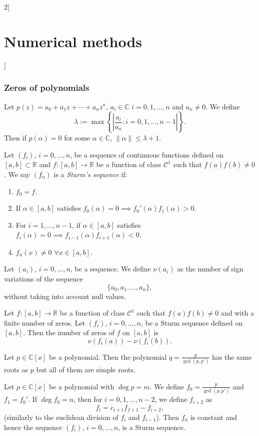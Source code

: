 \documentclass[class=article,10pt,crop=false]{standalone}
\begin{document}
\begin{multicols}{2}[\section{Numerical methods}]
\subsubsection*{Zeros of polynomials}
\begin{lemma}
Let $p(z)=a_0+a_1z+\cdots+a_nz^n$, $a_i\in\mathbb{C}$ $i=0,1,\ldots,n$ and $a_n\ne 0$. We define $$\lambda:=\max\left\{\left|\frac{a_i}{a_n}:i=0,1,\ldots,n-1\right|\right\}.$$ Then if $p(\alpha)=0$ for some $\alpha\in\mathbb{C}$, $\|\alpha\|\leq\lambda+1$.
\end{lemma}
\begin{definition}
Let $(f_i)$, $i=0,\ldots,n$, be a sequence of continuous functions defined on $[a,b]\subset\mathbb{R}$ and $f:[a,b]\rightarrow\mathbb{R}$ be a function of class $\mathcal{C}^1$ such that $f(a)f(b)\ne 0$. We say $(f_n)$ is a \textit{Sturm's sequence} if:
\begin{enumerate}
    \item $f_0=f$.
    \item If $\alpha\in[a,b]$ satisfies $f_0(\alpha)=0\implies f_0'(\alpha)f_1(\alpha)>0$.
    \item For $i=1,\ldots,n-1$, if $\alpha\in[a,b]$ satisfies $f_i(\alpha)=0\implies f_{i-1}(\alpha)f_{i+1}(\alpha)<0$.
    \item $f_n(x)\ne0$ $\forall x\in[a,b]$.
\end{enumerate}
\end{definition}
\begin{definition}
Let $(a_i)$, $i=0,\ldots,n$, be a sequence. We define $\nu(a_i)$ as the number of sign variations of the sequence $$\{a_0,a_1,\ldots,a_n\},$$ without taking into account null values. 
\end{definition}
\begin{theorem}
Let $f:[a,b]\rightarrow\mathbb{R}$ be a function of class $\mathcal{C}^1$ such that $f(a)f(b)\ne 0$ and with a finite number of zeros. Let $(f_i)$, $i=0,\ldots,n$, be a Sturm sequence defined on $[a,b]$. Then the number of zeros of $f$ on $[a,b]$ is $$\nu\left(f_i(a)\right)-\nu\left(f_i(b)\right).$$
\end{theorem}
\begin{lemma}
Let $p\in\mathbb{C}[x]$ be a polynomial. Then the polynomial $\displaystyle q=\frac{p}{\gcd(p,p')}$ has the same roots as $p$ but all of them are simple roots.
\end{lemma}
\begin{prop}
Let $p\in\mathbb{C}[x]$ be a polynomial with $\deg p=m$. We define $\displaystyle f_0=\frac{p}{\gcd(p,p')}$ and $f_1=f_0'$. If $\deg f_0=n$, then for $i=0,1,\ldots,n-2$, we define $f_{i+2}$ as $$f_i=c_{i+1}f_{f+1}-f_{i+2},$$ (similarly to the euclidean division of $f_i$ and $f_{i-1}$). Then $f_n$ is constant and hence the sequence $(f_i)$, $i=0,\ldots,n$, is a Sturm sequence.

\end{prop}
\end{multicols}
\end{document}
